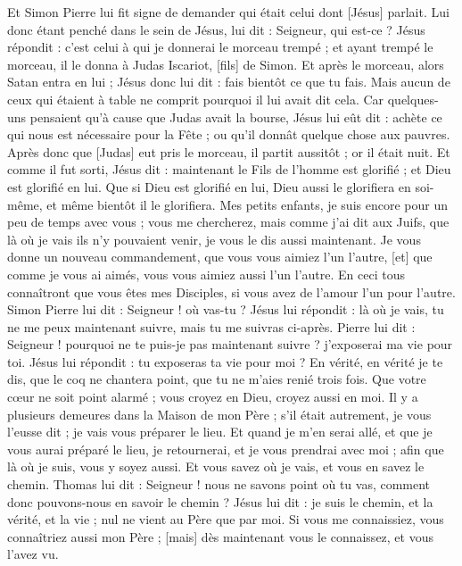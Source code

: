 \begin{multicols}{2}
Et Simon Pierre lui fit signe de demander qui était celui dont [Jésus] parlait.
Lui donc étant penché dans le sein de Jésus, lui dit : Seigneur, qui est-ce ?
Jésus répondit : c'est celui à qui je donnerai le morceau trempé ; et ayant trempé le morceau, il le donna à Judas Iscariot, [fils] de Simon.
Et après le morceau, alors Satan entra en lui ; Jésus donc lui dit : fais bientôt ce que tu fais.
Mais aucun de ceux qui étaient à table ne comprit pourquoi il lui avait dit cela.
Car quelques-uns pensaient qu'à cause que Judas avait la bourse, Jésus lui eût dit : achète ce qui nous est nécessaire pour la Fête ; ou qu'il donnât quelque chose aux pauvres.
Après donc que [Judas] eut pris le morceau, il partit aussitôt ; or il était nuit.
Et comme il fut sorti, Jésus dit : maintenant le Fils de l'homme est glorifié ; et Dieu est glorifié en lui.
Que si Dieu est glorifié en lui, Dieu aussi le glorifiera en soi-même, et même bientôt il le glorifiera.
Mes petits enfants, je suis encore pour un peu de temps avec vous ; vous me chercherez, mais comme j'ai dit aux Juifs, que là où je vais ils n'y pouvaient venir, je vous le dis aussi maintenant.
Je vous donne un nouveau commandement, que vous vous aimiez l'un l'autre, [et] que comme je vous ai aimés, vous vous aimiez aussi l'un l'autre.
En ceci tous connaîtront que vous êtes mes Disciples, si vous avez de l'amour l'un pour l'autre.
Simon Pierre lui dit : Seigneur ! où vas-tu ? Jésus lui répondit : là où je vais, tu ne me peux maintenant suivre, mais tu me suivras ci-après.
Pierre lui dit : Seigneur ! pourquoi ne te puis-je pas maintenant suivre ? j'exposerai ma vie pour toi.
Jésus lui répondit : tu exposeras ta vie pour moi ? En vérité, en vérité je te dis, que le coq ne chantera point, que tu ne m'aies renié trois fois.
\VerseOne{}Que votre cœur ne soit point alarmé ; vous croyez en Dieu, croyez aussi en moi.
Il y a plusieurs demeures dans la Maison de mon Père ; s'il était autrement, je vous l'eusse dit ; je vais vous préparer le lieu.
Et quand je m'en serai allé, et que je vous aurai préparé le lieu, je retournerai, et je vous prendrai avec moi ; afin que là où je suis, vous y soyez aussi.
Et vous savez où je vais, et vous en savez le chemin.
Thomas lui dit : Seigneur ! nous ne savons point où tu vas, comment donc pouvons-nous en savoir le chemin ?
Jésus lui dit : je suis le chemin, et la vérité, et la vie ; nul ne vient au Père que par moi.
Si vous me connaissiez, vous connaîtriez aussi mon Père ; [mais] dès maintenant vous le connaissez, et vous l'avez vu.

\end{multicols}
